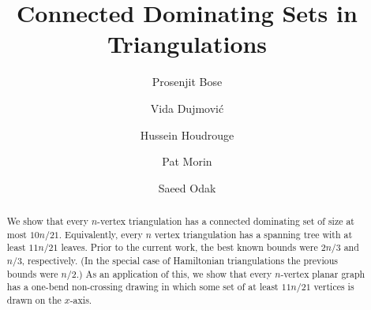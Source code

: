 \documentclass[12pt]{article}
\title{Connected Dominating Sets in Triangulations}
\author{Prosenjit Bose \and Vida Dujmović \and Hussein Houdrouge \and Pat Morin \and Saeed Odak}
\theoremstyle{definition}
\newcommand{\vida}[1]{[{\color{pink}VD: #1}]}
\newcommand{\saeed}[1]{[{\color{blue}SO: #1}]}
\begin{document}
\maketitle

\begin{abstract}
  We show that every $n$-vertex triangulation has a connected dominating set of size at most $10n/21$.  Equivalently, every $n$ vertex triangulation has a spanning tree with at least $11n/21$ leaves. Prior to the current work, the best known bounds were $2n/3$ and $n/3$, respectively. (In the special case of Hamiltonian triangulations the previous bounds were $n/2$.)  As an application of this, we show that every $n$-vertex planar graph has a one-bend non-crossing drawing in which some set of at least $11n/21$ vertices is drawn on the $x$-axis.
\end{abstract}




\end{document}
